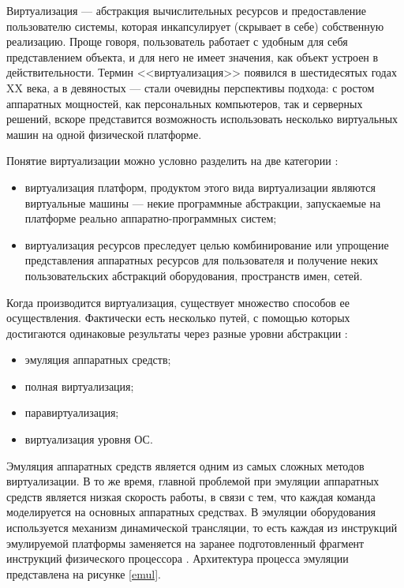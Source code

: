 Виртуализация --- абстракция вычислительных ресурсов и предоставление пользователю системы, которая инкапсулирует (скрывает в себе) собственную реализацию.
Проще говоря, пользователь работает с удобным для себя представлением объекта, и для него не имеет значения, как объект устроен в действительности.
Термин <<виртуализация>> появился в шестидесятых годах XX века, а в девяностых --- стали очевидны перспективы подхода: с ростом аппаратных мощностей, как персональных компьютеров, так и серверных решений, вскоре представится возможность использовать несколько виртуальных машин на одной физической платформе.

Понятие виртуализации можно условно разделить на две категории \cite{ibm-virt}:
\begin{itemize}
  \item виртуализация платформ, продуктом этого вида виртуализации являются виртуальные машины --- некие программные абстракции, запускаемые на платформе реально аппаратно-программных систем;
  \item виртуализация ресурсов преследует целью комбинирование или упрощение представления аппаратных ресурсов для пользователя и получение неких пользовательских абстракций оборудования, пространств имен, сетей.
\end{itemize}

Когда производится виртуализация, существует множество способов ее осуществления.
Фактически есть несколько путей, с помощью которых достигаются одинаковые результаты через разные уровни абстракции \cite{openvz-tutorial}:
\begin{itemize}
  \item эмуляция аппаратных средств;
  \item полная виртуализация;
  \item паравиртуализация;
  \item виртуализация уровня ОС.
\end{itemize}

Эмуляция аппаратных средств является одним из самых сложных методов виртуализации.
В то же время, главной проблемой при эмуляции аппаратных средств является низкая скорость работы, в связи с тем, что каждая команда моделируется на основных аппаратных средствах. 
В эмуляции оборудования используется механизм динамической трансляции, то есть каждая из инструкций эмулируемой платформы заменяется на заранее подготовленный фрагмент инструкций физического процессора \cite{qemu-ibm}.
Архитектура процесса эмуляции представлена на рисунке \ref{emul}.

